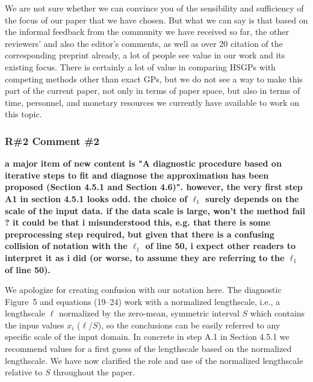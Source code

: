 \documentclass[11pt]{report}
\begin{document}
We are not sure whether we can convince you of the sensibility and sufficiency of the focus of our paper that we have chosen. But what we can say is that based on the informal feedback from the community we have received so far, the other reviewers' and also the editor's comments, as well as over 20 citation of the corresponding preprint already, a lot of people see value in our work and its existing focus. There is certainly a lot of value in comparing HSGPs with competing methods other than exact GPs, but we do not see a way to make this part of the current paper, not only in terms of paper space, but also in terms of time, personnel, and monetary resources we currently have available to work on this topic.





\subsubsection*{R\#2 Comment \#2}

\textbf{a major item of new content is "A diagnostic procedure based on iterative steps to fit and diagnose the approximation has been proposed (Section 4.5.1 and Section 4.6)". however, the very first step A1 in section 4.5.1 looks odd. the choice of $\ell_1$ surely depends on the scale of the input data. if the data scale is large, won't the method fail ? it could be that i misunderstood this, e.g. that there is some preprocessing step required, but given that there is a confusing collision of notation with the $\ell_1$ of line 50, i expect other readers to interpret it as i did (or worse, to assume they are referring to the $\ell_1$ of line 50).}

We apologize for creating confusion with our notation here. {\color{blue}The diagnostic Figure~5 and equations (19--24) work with a normalized lengthscale, i.e., a lengthscale $\ell$ normalized by the zero-mean, symmetric interval $S$ which contains the inpus values $x_i$ ($\ell/S$), so the conclusions can be easily referred to any specific scale of the input domain. In concrete in step A.1 in Section 4.5.1 we recommend values for a first guess of the lengthscale based on the normalized lengthscale. We have now clarified the role and use of the normalized lengthscale relative to $S$ throughout the paper.}
\end{document}
